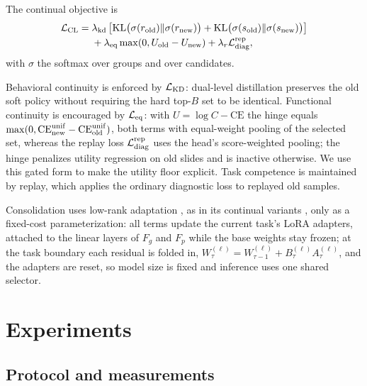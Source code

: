\documentclass{article}
\def\L{{\cal L}}
\newcommand{\Fg}{F_g}
\newcommand{\Fp}{F_p}
\begin{document}
The continual objective is
\begin{align}
\L_{\mathrm{CL}}
={}&
\lambda_{\mathrm{kd}}
\left[
\mathrm{KL}\bigl(\sigma(r_{\mathrm{old}})\Vert \sigma(r_{\mathrm{new}})\bigr)
+
\mathrm{KL}\bigl(\sigma(s_{\mathrm{old}})\Vert \sigma(s_{\mathrm{new}})\bigr)
\right]
\nonumber\\
&+
\lambda_{\mathrm{eq}}
\max(0,U_{\mathrm{old}}-U_{\mathrm{new}})
+
\lambda_r \L_{\mathrm{diag}}^{\mathrm{rep}},
\label{eq:lcl}
\end{align}
with $\sigma$ the softmax over groups and over candidates.

Behavioral continuity is enforced by $\L_{\rm KD}$: dual-level distillation preserves the old soft policy without requiring the hard top-$B$ set to be identical. Functional continuity is encouraged by $\L_{\rm eq}$: with $U=\log C-\mathrm{CE}$ the hinge equals $\max(0,\mathrm{CE}^{\rm unif}_{\rm new}-\mathrm{CE}^{\rm unif}_{\rm old})$, both terms with equal-weight pooling of the selected set, whereas the replay loss $\L_{\mathrm{diag}}^{\mathrm{rep}}$ uses the head's score-weighted pooling; the hinge penalizes utility regression on old slides and is inactive otherwise. We use this gated form to make the utility floor explicit. Task competence is maintained by replay, which applies the ordinary diagnostic loss to replayed old samples.

Consolidation uses low-rank adaptation \cite{hu2022lora}, as in its continual variants \cite{liang2024inflora,wu2025sdlora,he2025cllora,chen2026flexem}, only as a fixed-cost parameterization: all terms update the current task's LoRA adapters, attached to the linear layers of $\Fg$ and $\Fp$ while the base weights stay frozen; at the task boundary each residual is folded in, $W^{(\ell)}_{\tau}=W^{(\ell)}_{\tau-1}+B^{(\ell)}_\tau A^{(\ell)}_\tau$, and the adapters are reset, so model size is fixed and inference uses one shared selector.

\section{Experiments}
\label{sec:exp}

\subsection{Protocol and measurements}
\end{document}
